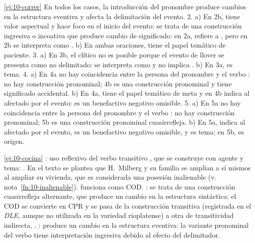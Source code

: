 \begin{solucion}{\ref{ej:10-correr}}
En todos los casos, la introducción del pronombre produce cambios en la
estructura eventiva y afecta la delimitación del evento. 2. a) En 2b, 
tiene valor aspectual y hace foco en el inicio del evento: se trata de una
construcción ingresiva o incoativa que produce cambio de significado: en 2a,
 refiere a , pero en 2b
 se interpreta como . b) En ambas
oraciones,  tiene el papel temático de paciente. 3. a) En 3b, el
clítico no es posible porque el evento de llover se presenta como no delimitado:
se interpreta como  y no implica
. b) En 3a,  es tema. 4. a)
En 4a no hay coincidencia entre la persona del pronombre  y el verbo
: no hay construcción pronominal; 4b es una construcción pronominal y
tiene significado accidental. b) En 4a,  tiene el papel temático de
meta y en 4b  indica al afectado por el evento: es un benefactivo
negativo omisible. 5. a) En 5a no hay coincidencia entre la persona del pronombre
 y el verbo : no hay construcción pronominal; 5b es una
construcción pronominal cuasirrefleja. b) En 5a,  indica al afectado
por el evento, es un benefactivo negativo omisible, y  es tema;
en 5b,  es origen.
\end{solucion}

\begin{solucion}{\ref{ej:10-cocina}}
: uso reflexivo del verbo transitivo , que se
construye con agente y tema: . En el texto se plantea
que H.~Milberg y su familia se amplían a sí mismos al ampliar su vivienda, que es
considerada una posesión inalienable (v. nota~\ref{fn:10-inalienable}).
 funciona como COD. : se trata de una construcción
cuasirrefleja alternante, que produce un cambio en la estructura sintáctica: el
COD se convierte en CPR y se pasa de la construcción transitiva  (registrada en el \textit{DLE}, aunque no utilizada en la variedad
rioplatense) a otra de transitividad indirecta, .
:  produce un cambio en la estructura eventiva: la
variante pronominal del verbo tiene interpretación ingresiva debido al efecto
del  delimitador.
\end{solucion}

